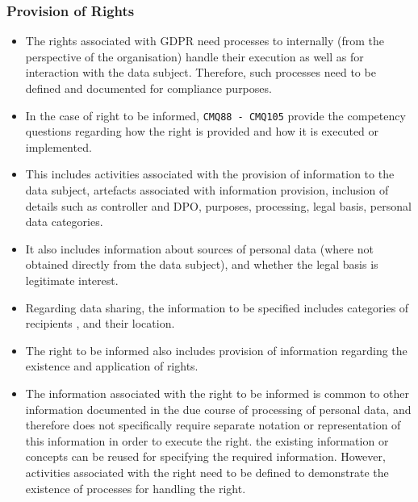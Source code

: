 \subsubsection{Provision of Rights}
\begin{itemize}
    \item The rights associated with GDPR need processes to internally (from the perspective of the organisation) handle their execution as well as for interaction with the data subject. Therefore, such processes need to be defined and documented for compliance purposes.
    \item In the case of right to be informed, \texttt{CMQ88 - CMQ105} provide the competency questions regarding how the right is provided and how it is executed or implemented.
    \item This includes activities associated with the provision of information to the data subject, artefacts associated with information provision, inclusion of details such as controller and DPO, purposes, processing, legal basis, personal data categories.
    \item It also includes information about sources of personal data (where not obtained directly from the data subject), and whether the legal basis is legitimate interest.
    \item Regarding data sharing, the information to be specified includes categories of recipients , and their location.
    \item The right to be informed also includes provision of information regarding the existence and application of rights.
    \item The information associated with the right to be informed is common to other information documented in the due course of processing of personal data, and therefore does not specifically require separate notation or representation of this information in order to execute the right. the existing information or concepts can be reused for specifying the required information. However, activities associated with the right need to be defined to demonstrate the existence of processes for handling the right.
\end{itemize}

